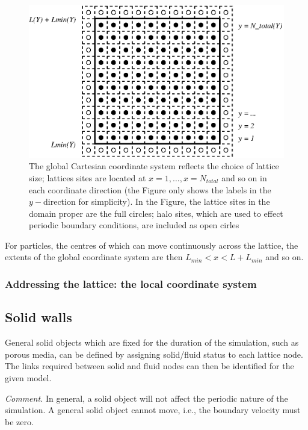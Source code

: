\begin{figure}[h]
\begin{center}
\includegraphics{xfig/fig_c1.eps}
\end{center}
\caption{The global Cartesian coordinate system reflects the choice
of lattice size; lattices sites are located at
$x=1, \ldots, x = N_{total}$ and so on in each coordinate direction
(the Figure only shows the labels in the $y-$direction for simplicity).
In the Figure, the lattice sites in the domain proper are the full
circles; halo sites, which are used to effect periodic boundary
conditions, are included as open cirles}
\label{fig_c1}
\end{figure}

For particles, the centres of which can move continuously across the
lattice, the extents of the global coordinate system are then
$L_{min} < x < L + L_{min}$ and so on.

\subsubsection{Addressing the lattice: the local coordinate system}


\subsection{Solid walls}

General solid objects which are fixed for the duration of
the simulation, such as porous media, can be defined
by assigning solid/fluid status to each lattice node. 
The links required between solid and fluid nodes can
then be identified for the given model.

\textit{Comment.} In general, a solid object will not
affect the periodic nature of the simulation. A general
solid object cannot move, i.e., the boundary velocity
must be zero.

